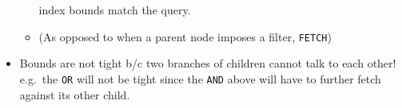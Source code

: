 \documentclass[xcolor=dvipsnames, 9pt]{beamer}
\begin{document}
\begin{frame}
\begin{columns}
\begin{column}{0.5\textwidth}
\begin{itemize}
\begin{itemize}
                            index bounds match the query.
                        \item (As opposed to when a parent node imposes a
                            filter, \texttt{FETCH})
                    \end{itemize}
                \item Bounds are not tight b/c two branches of children cannot
                    talk to each other! e.g.\ the \texttt{OR} will not be tight
                    since the \texttt{AND} above will have to further fetch
                    against its other child.
            \end{itemize}
        \end{column}
    \end{columns}
\end{frame}
\end{document}
